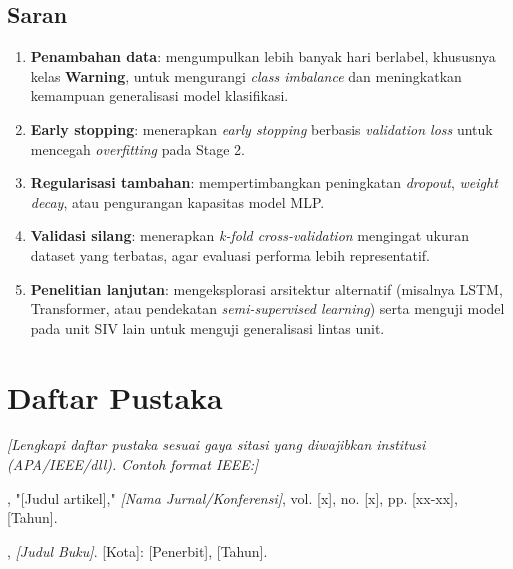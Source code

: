 \documentclass[12pt,a4paper]{report}
\newcommand{\warning}{\textcolor{orange!80!black}{\textbf{Warning}}}
\begin{document}
\section{Saran}
\begin{enumerate}
    \item \textbf{Penambahan data}: mengumpulkan lebih banyak hari berlabel, khususnya kelas \warning, untuk mengurangi \textit{class imbalance} dan meningkatkan kemampuan generalisasi model klasifikasi.
    \item \textbf{Early stopping}: menerapkan \textit{early stopping} berbasis \textit{validation loss} untuk mencegah \textit{overfitting} pada Stage 2.
    \item \textbf{Regularisasi tambahan}: mempertimbangkan peningkatan \textit{dropout}, \textit{weight decay}, atau pengurangan kapasitas model MLP.
    \item \textbf{Validasi silang}: menerapkan \textit{k-fold cross-validation} mengingat ukuran dataset yang terbatas, agar evaluasi performa lebih representatif.
    \item \textbf{Penelitian lanjutan}: mengeksplorasi arsitektur alternatif (misalnya LSTM, Transformer, atau pendekatan \textit{semi-supervised learning}) serta menguji model pada unit SIV lain untuk menguji generalisasi lintas unit.
\end{enumerate}

\newpage
\chapter*{Daftar Pustaka}
\noindent\textit{[Lengkapi daftar pustaka sesuai gaya sitasi yang diwajibkan institusi (APA/IEEE/dll). Contoh format IEEE:]}

\begin{enumerate}[label={[\arabic*]}]
    \item [Nama Penulis], "[Judul artikel]," \textit{[Nama Jurnal/Konferensi]}, vol. [x], no. [x], pp. [xx-xx], [Tahun].
    \item [Nama Penulis], \textit{[Judul Buku]}. [Kota]: [Penerbit], [Tahun].
\end{enumerate}

\newpage
\end{document}
